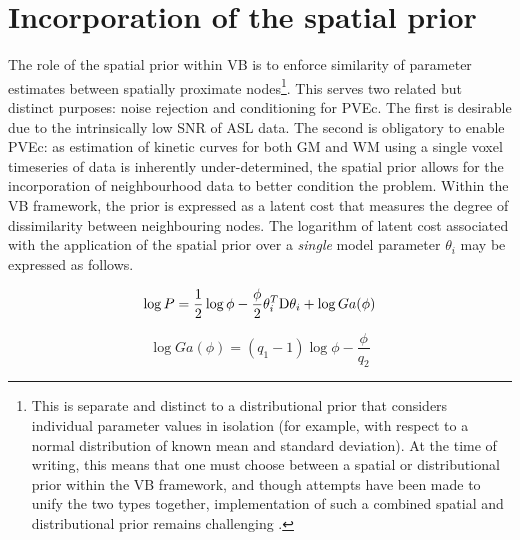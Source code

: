 \section{Incorporation of the spatial prior}
\label{svb_spatial_prior}

The role of the spatial prior within VB is to enforce similarity of parameter estimates between spatially proximate nodes\footnote{This is separate and distinct to a distributional prior that considers individual parameter values in isolation (for example, with respect to a normal distribution of known mean and standard deviation). At the time of writing, this means that one must choose between a spatial or distributional prior within the VB framework, and though attempts have been made to unify the two types together, implementation of such a combined spatial and distributional prior remains challenging \cite{Groves2009a}.}. This serves two related but distinct purposes: noise rejection and conditioning for PVEc. The first is desirable due to the intrinsically low SNR of ASL data. The second is obligatory to enable PVEc: as estimation of kinetic curves for both GM and WM using a single voxel timeseries of data is inherently under-determined, the spatial prior allows for the incorporation of neighbourhood data to better condition the problem. Within the VB framework, the prior is expressed as a latent cost that measures the degree of dissimilarity between neighbouring nodes. The logarithm of latent cost associated with the application of the spatial prior over a \textit{single} model parameter $\theta_i$ may be expressed as follows.  

\begin{equation}
\log{P} = \frac{1}{2}\log{\phi} - \frac{\phi}{2}\theta_i^T\mathrm{D}\theta_i + \log{Ga(\phi)}
\end{equation}

\begin{equation}
\log{Ga(\phi)} = (q_1 - 1) \log{\phi} - \frac{\phi}{q_2} 
\end{equation}


